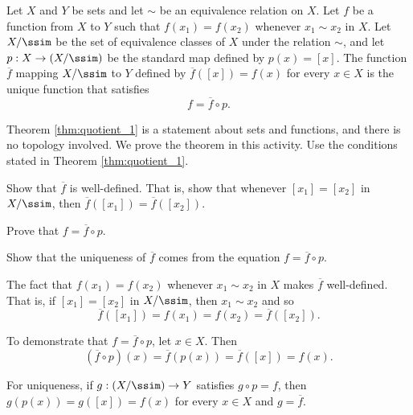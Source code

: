 \begin{theorem} \label{thm:quotient_1} Let $X$ and $Y$ be sets and let $\sim$ be an equivalence relation on $X$. Let $f$ be a function from $X$ to $Y$ such that $f(x_1) = f(x_2)$ whenever $x_1 \sim x_2$ in $X$. Let $X/\ssim$ be the set of equivalence classes of $X$ under the relation $\sim$, and let $p: X \to (X/\ssim)$ be the standard map defined by $p(x) = [x]$.  The function $\overline{f}$ mapping $X/\ssim$ to $Y$ defined by $\overline{f}([x]) = f(x)$ for every $x \in X$ is the unique function that satisfies 
\[f = \overline{f} \circ p.\]
\end{theorem}


\begin{activity} Theorem \ref{thm:quotient_1} is a statement about sets and functions, and there is no topology involved. We prove the theorem in this activity. Use the conditions stated in Theorem \ref{thm:quotient_1}.
\ba
\item Show that $\overline{f}$ is well-defined. That is, show that whenever $[x_1] = [x_2]$ in $X/\ssim$, then $\overline{f}([x_1]) =\overline{f}([x_2])$.

\item Prove that $f = \overline{f} \circ p$. 

\item Show that the uniqueness of $\overline{f}$ comes from the equation $f = \overline{f} \circ p$.

\ea

\end{activity}


\ActivitySolution

\ba
\item The fact that $f(x_1) = f(x_2)$ whenever $x_1 \sim x_2$ in $X$ makes $\overline{f}$ well-defined. That is, if $[x_1] = [x_2]$ in $X/\ssim$, then $x_1 \sim x_2$ and so 
\[\overline{f}([x_1]) = f(x_1) = f(x_2) = \overline{f}([x_2]).\]

\item To demonstrate that $f = \overline{f} \circ p$, let $x \in  X$. Then 
\[(\overline{f} \circ p)(x) = \overline{f}(p(x)) = \overline{f}([x]) = f(x).\]

\item For uniqueness, if $g : (X/\ssim) \to Y$ satisfies $g \circ p = f$, then $g(p(x)) = g([x]) = f(x)$ for every $x \in X$ and $g = \overline{f}$.

\ea

